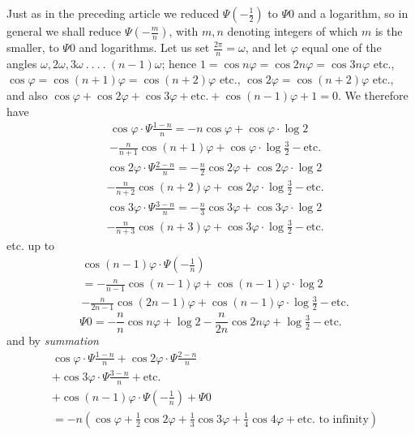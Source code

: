 Just as in the preceding article we reduced $\Psi\left(-\tfrac12\right)$ to $\Psi0$ and a logarithm, so in general we shall reduce $\Psi\left(-\frac mn\right)$, with $m,n$ denoting integers of which $m$ is the smaller, to $\Psi0$ and logarithms. Let us set $\frac{2\pi}{n}=\omega$, and let $\varphi$ equal one of the angles $\omega,2\omega,3\omega\ .\ .\ .\ .\ (n-1)\omega$; hence $1=\cos n\varphi=\cos2n\varphi=\cos3n\varphi$ etc., $\cos\varphi=\cos(n+1)\varphi=\cos(n+2)\varphi$ etc., $\cos2\varphi=\cos(n+2)\varphi$ etc., and also $\cos\varphi+\cos2\varphi+\cos3\varphi+\text{etc.}+\cos(n-1)\varphi+1=0$. We therefore have
\[
\begin{aligned}
&\cos\varphi\cdot\Psi\frac{1-n}{n}=-n\cos\varphi+\cos\varphi\cdot\log2\\[4pt]
&-\frac{n}{n+1}\cos(n+1)\varphi+\cos\varphi\cdot\log\tfrac32-\text{etc.}
\end{aligned}
\]
\[
\begin{aligned}
&\cos2\varphi\cdot\Psi\frac{2-n}{n}=-\frac n2\cos2\varphi+\cos2\varphi\cdot\log2\\[4pt]
&-\frac{n}{n+2}\cos(n+2)\varphi+\cos2\varphi\cdot\log\tfrac32-\text{etc.}
\end{aligned}
\]
\[
\begin{aligned}
&\cos3\varphi\cdot\Psi\frac{3-n}{n}=-\frac n3\cos3\varphi+\cos3\varphi\cdot\log2\\[4pt]
&-\frac{n}{n+3}\cos(n+3)\varphi+\cos3\varphi\cdot\log\tfrac32-\text{etc.}
\end{aligned}
\]
etc. up to
\[
\begin{aligned}
&\cos(n-1)\varphi\cdot\Psi\left(-\frac1n\right)
\\[4pt]
&=-\frac{n}{n-1}\cos(n-1)\varphi+\cos(n-1)\varphi\cdot\log2\\[4pt]
&-\frac{n}{2n-1}\cos(2n-1)\varphi
+\cos(n-1)\varphi\cdot\log\tfrac32-\text{etc.}
\end{aligned}
\]
\[
\Psi0=-\frac nn\cos n\varphi+\log2-\frac{n}{2n}\cos2n\varphi+\log\tfrac32-\text{etc.}
\]
and by \textit{summation}
\[
\begin{aligned}
&\cos\varphi\cdot\Psi\frac{1-n}{n}+\cos2\varphi\cdot\Psi\frac{2-n}{n}\\[4pt]
&+\cos3\varphi\cdot\Psi\frac{3-n}{n}+\text{etc.}\\[4pt]
&+\cos(n-1)\varphi\cdot\Psi\left(-\frac1n\right)+\Psi0
\\[4pt]
&=-n(\cos\varphi+\tfrac12\cos2\varphi+\tfrac13\cos3\varphi+\tfrac14\cos4\varphi+\text{etc. to infinity})
\end{aligned}
\]
